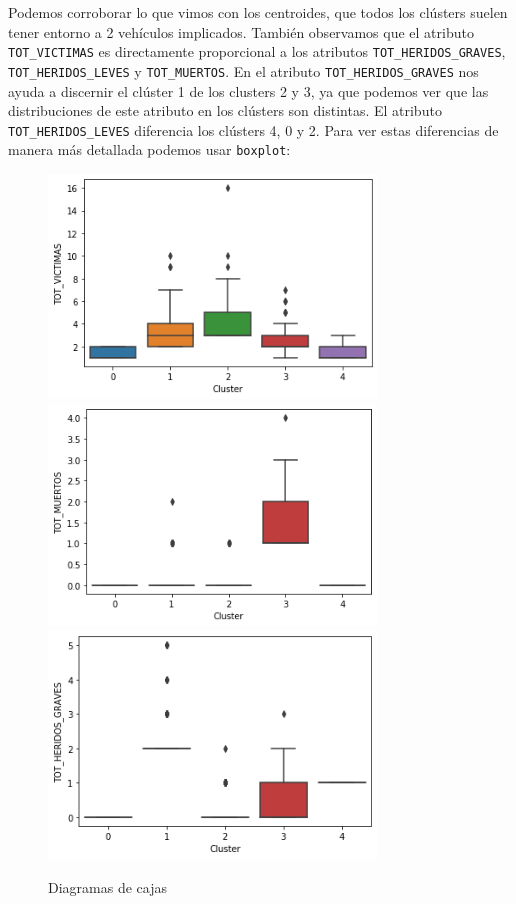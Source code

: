\documentclass[a4]{article}
\begin{document}
Podemos corroborar lo que vimos con los centroides, que todos los clústers suelen tener entorno a 2 vehículos implicados. También observamos que el atributo \texttt{TOT\_VICTIMAS} es directamente proporcional a los atributos \texttt{TOT\_HERIDOS\_GRAVES}, \texttt{TOT\_HERIDOS\_LEVES} y \texttt{TOT\_MUERTOS}. En el atributo \texttt{TOT\_HERIDOS\_GRAVES} nos ayuda a discernir el clúster 1 de los clusters 2 y 3, ya que podemos ver que las distribuciones de este atributo en los clústers son distintas. El atributo \texttt{TOT\_HERIDOS\_LEVES} diferencia los clústers 4, 0 y 2. Para ver estas diferencias de manera más detallada podemos usar \texttt{boxplot}:

\begin{figure}[H]
  \centering
  \caption{Diagramas de cajas}
  \includegraphics[width=87mm]{imagenes/c1_kmeans_bp_vic}
  \includegraphics[width=87mm]{imagenes/c1_kmeans_bp_muertos}
    \includegraphics[width=87mm]{imagenes/c1_kmeans_bp_hg}

\end{figure}
\end{document}
